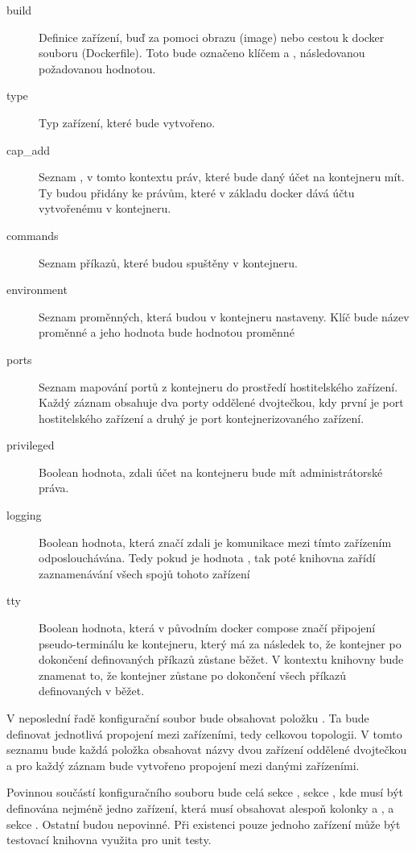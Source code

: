 \begin{description}
    \item[build] Definice zařízení, buď za pomoci obrazu (image) nebo cestou k docker souboru (Dockerfile). Toto bude označeno klíčem  a , následovanou požadovanou hodnotou.
    \item[type] Typ zařízení, které bude vytvořeno. 
    \item[cap\_add] Seznam , v tomto kontextu práv, které bude daný účet na kontejneru mít. Ty budou přidány ke právům, které v základu docker dává účtu vytvořenému v kontejneru. 
    \item[commands] Seznam příkazů, které budou spuštěny v kontejneru.
    \item[environment] Seznam proměnných, která budou v kontejneru nastaveny. Klíč bude název proměnné a jeho hodnota bude hodnotou proměnné
    \item[ports] Seznam mapování portů z kontejneru do prostředí hostitelského zařízení. Každý záznam obsahuje dva porty oddělené dvojtečkou, kdy první je port hostitelského zařízení a druhý je port kontejnerizovaného zařízení.
    \item[privileged] Boolean hodnota, zdali účet na kontejneru bude mít administrátorské práva.
    \item[logging] Boolean hodnota, která značí zdali je komunikace mezi tímto zařízením odposlouchávána. Tedy pokud je hodnota , tak poté knihovna zařídí zaznamenávání všech spojů tohoto zařízení
    \item[tty] Boolean hodnota, která v původním docker compose značí připojení pseudo-terminálu ke kontejneru, který má za následek to, že kontejner po dokončení definovaných příkazů zůstane běžet. V kontextu knihovny bude znamenat to, že kontejner zůstane po dokončení všech příkazů definovaných v  běžet. 
\end{description}

V neposlední řadě konfigurační soubor bude obsahovat položku . Ta bude definovat jednotlivá propojení mezi zařízeními, tedy celkovou topologii. V tomto seznamu bude každá položka obsahovat názvy dvou zařízení oddělené dvojtečkou a pro každý záznam bude vytvořeno propojení mezi danými zařízeními.

Povinnou součástí konfiguračního souboru bude celá sekce , sekce , kde musí být definována nejméně jedno zařízení, která musí obsahovat alespoň kolonky  a , a sekce . Ostatní budou nepovinné. Při existenci pouze jednoho zařízení může být testovací knihovna využita pro unit testy. 

